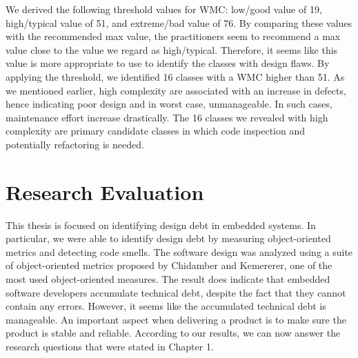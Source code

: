 We derived the following threshold values for WMC: low/good value of 19, high/typical value of 51, and extreme/bad value of 76. By comparing these values with the recommended max value, the practitioners seem to recommend a max value close to the value we regard as high/typical. Therefore, it seems like this value is more appropriate to use to identify the classes with design flaws. By applying the threshold, we identified 16 classes with a WMC higher than 51. As we mentioned earlier, high complexity are associated with an increase in defects, hence indicating poor design and in worst case, unmanageable. In such cases, maintenance effort increase drastically. The 16 classes we revealed with high complexity are primary candidate classes in which code inspection and potentially refactoring is needed.









\section{Research Evaluation}


This thesis is focused on identifying design debt in embedded systems. In particular, we were able to identify design debt by measuring object-oriented metrics and detecting code smells. The software design was analyzed using a suite of object-oriented metrics proposed by Chidamber and Kemererer, one of the most used object-oriented measures. The result does indicate that embedded software developers accumulate technical debt, despite the fact that they cannot contain any errors\cite{pretschner2007software,ebert2009embedded,trienekens2010quality}. However, it seems like the accumulated technical debt is manageable. An important aspect when delivering a product is to make sure the product is stable and reliable. According to our results, we can now answer the research questions that were stated in Chapter 1.


